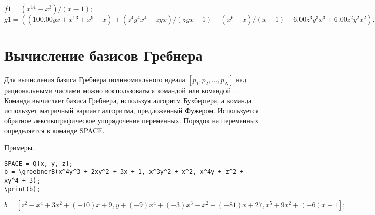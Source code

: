 {$f1 = (x^{14}-x^{3})/(x-1); $\\
\hspace*{4mm} $g1 = ((100. 00yx+x^{13}+x^{9}+x)+(z^{4}y^{4}x^{4}-zyx)/(zyx-1)+(x^{6}-x)/(x-1)+6. 00z^{3}y^{3}x^{3}+6. 00z^{2}y^{2}x^{2}). $}

\section{Вычисление базисов Гребнера}


Для вычисления базиса Гребнера полиномиального идеала $[p_{1}, p_{2}, \ldots, p_{N}]$ над рациональными числами можно воспользоваться командой  или командой . 
Команда  вычисляет базиса Гребнера, используя алгоритм Бухбергера, а команда  использует матричный вариант алгоритма, предложенный Фужером.  
Используется обратное лексикографическое упорядочение переменных. Порядок на переменных определяется в команде SPACE.

\underline{Примеры. }

\vspace*{-2mm}
\begin{verbatim}
SPACE = Q[x, y, z]; 
b = \groebnerB(x^4y^3 + 2xy^2 + 3x + 1, x^3y^2 + x^2, x^4y + z^2 + xy^4 + 3);  
\print(b);
\end{verbatim}

{$b = [z^2-x^4+3x^2+(-10)x+9, y+(-9)x^4+(-3)x^3-x^2+(-81)x+27, x^5+9x^2+(-6)x+1];$}


